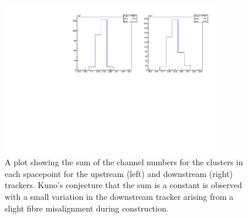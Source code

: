   
  \begin{figure}[p]
    \centering
    \includegraphics[width=0.85\textwidth, angle=0]{08-Performance/kuno_plot.pdf}
    \caption{\label{fig:kuno} A plot showing the sum of the channel numbers for the clusters in each spacepoint for the upstream (left) and downstream (right) trackers. Kuno's conjecture that the sum is a constant is observed with a small variation in the downstream tracker arising from a slight fibre misalignment during construction.}
  \end{figure}
  
